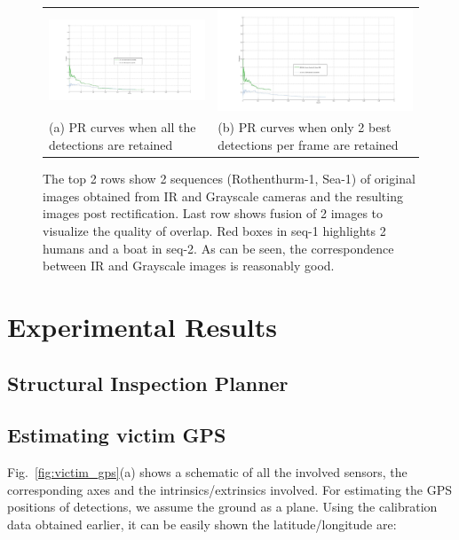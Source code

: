 \documentclass[runningheads]{llncs}
\begin{document}
\begin{figure}
  \centering
  \begin{tabular}{m{5cm}m{5cm}}
  	\includegraphics[width=6cm]{img/fusion/Roth/PR-roth-all-detections.jpg} &
  	\includegraphics[width=6cm]{img/fusion/Roth/PR-roth-top-detections.jpg} \\
  	\small (a) PR curves when all the detections are retained &
  	\small (b) PR curves when only 2 best detections per frame are retained
  \end{tabular}

  \caption{The top 2 rows show 2 sequences (Rothenthurm-1, Sea-1) of original images obtained from IR and Grayscale cameras and the resulting images post rectification. Last row shows fusion of 2 images to visualize the quality of overlap. Red boxes in seq-1 highlights 2 humans and a boat in seq-2. As can be seen, the correspondence between IR and Grayscale images is reasonably good.}\label{fig:fusion}
\end{figure}


\section{Experimental Results}

\subsection{Structural Inspection Planner}

\subsection{Estimating victim GPS}

Fig.~\ref{fig:victim_gps}(a) shows a schematic of all the involved sensors, the corresponding axes and the intrinsics/extrinsics involved. For estimating the GPS positions of detections, we assume the ground as a plane. Using the calibration data obtained earlier, it can be easily shown the latitude/longitude are:
\end{document}
